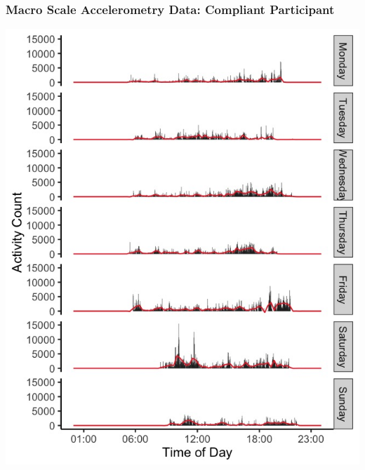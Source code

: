 \documentclass[10pt]{beamer}\usepackage[]{graphicx}\usepackage[]{color}
\begin{document}
\begin{frame}
\frametitle{Macro Scale Accelerometry Data: Compliant Participant}
\centering
\includegraphics[height=\textheight]{profile_id1}
\end{frame}
\end{document}
